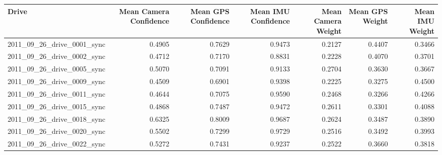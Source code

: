 \begin{tabular}{lrrrrrr}
\toprule
Drive & Mean Camera Confidence & Mean GPS Confidence & Mean IMU Confidence & Mean Camera Weight & Mean GPS Weight & Mean IMU Weight \\
\midrule
2011_09_26_drive_0001_sync & 0.4905 & 0.7629 & 0.9473 & 0.2127 & 0.4407 & 0.3466 \\
2011_09_26_drive_0002_sync & 0.4712 & 0.7170 & 0.8831 & 0.2228 & 0.4070 & 0.3701 \\
2011_09_26_drive_0005_sync & 0.5070 & 0.7091 & 0.9133 & 0.2704 & 0.3630 & 0.3667 \\
2011_09_26_drive_0009_sync & 0.4509 & 0.6901 & 0.9398 & 0.2225 & 0.3275 & 0.4500 \\
2011_09_26_drive_0011_sync & 0.4644 & 0.7075 & 0.9590 & 0.2468 & 0.3266 & 0.4266 \\
2011_09_26_drive_0015_sync & 0.4868 & 0.7487 & 0.9472 & 0.2611 & 0.3301 & 0.4088 \\
2011_09_26_drive_0018_sync & 0.6325 & 0.8009 & 0.9687 & 0.2624 & 0.3487 & 0.3890 \\
2011_09_26_drive_0020_sync & 0.5502 & 0.7299 & 0.9729 & 0.2516 & 0.3492 & 0.3993 \\
2011_09_26_drive_0022_sync & 0.5272 & 0.7431 & 0.9237 & 0.2522 & 0.3660 & 0.3818 \\
\bottomrule
\end{tabular}
